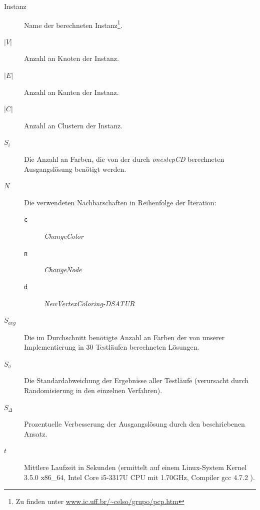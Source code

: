 \documentclass[paper=a4,fontsize=12pt]{scrartcl}
\begin{document}
\begin{description}
    \item[Instanz] Name der berechneten Instanz\footnote{Zu finden unter \url{www.ic.uff.br/~celso/grupo/pcp.htm}}.%
    \item[$|V|$] Anzahl an Knoten der Instanz.
    \item[$|E|$] Anzahl an Kanten der Instanz.
    \item[$|C|$] Anzahl an Clustern der Instanz.
    \item[$S_i$] Die Anzahl an Farben, die von der durch \emph{onestepCD} berechneten Ausgangslösung benötigt werden.
    \item[$N$] Die verwendeten Nachbarschaften in Reihenfolge der Iteration:
        \begin{description}
            \item[\texttt{c}] \emph{ChangeColor}
            \item[\texttt{n}] \emph{ChangeNode}
            \item[\texttt{d}] \emph{NewVertexColoring-DSATUR}
        \end{description}
    \item[$S_{avg}$] Die im Durchschnitt benötigte Anzahl an Farben der von unserer Implementierung in 30 Testläufen berechneten Lösungen.
    \item[$S_{\sigma}$] Die Standardabweichung der Ergebnisse aller Testläufe (verursacht durch Randomisierung in den einzelnen Verfahren).
    \item[$S_{\Delta}$] Prozentuelle Verbesserung der Ausgangslösung durch den beschriebenen Ansatz.
    \item[$t$] Mittlere Laufzeit in Sekunden (ermittelt auf einem Linux-System Kernel 3.5.0 x86\_64, Intel Core i5-3317U CPU mit 1.70GHz, Compiler gcc 4.7.2 ).
\end{description}
\end{document}
